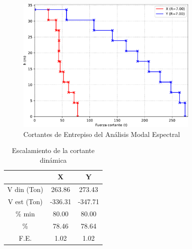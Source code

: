 \documentclass{article}%
\begin{document}
\begin{figure}[ht!]%
\includegraphics[width=0.8\textwidth]{images/cortantes}%
\caption{Cortantes de Entrepiso del Análisis Modal Espectral}%
\label{fig:corte_basal}%
\end{figure}

%


\begin{table}[H]%
\centering%
\caption{Escalamiento de la cortante dinámica}%
\begin{tabular}{ccc}
\toprule
 & X & Y \\
\midrule
V din (Ton) & 263.86 & 273.43 \\
V est (Ton) & -336.31 & -347.71 \\
\% min & 80.00 & 80.00 \\
\% & 78.46 & 78.64 \\
F.E. & 1.02 & 1.02 \\
\bottomrule
\end{tabular}
%
\end{table}

%
\end{document}
